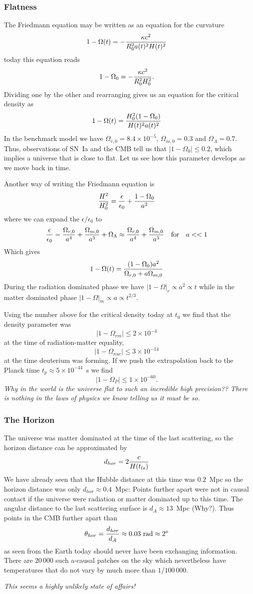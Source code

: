 \documentclass{article}
\begin{document}
\subsubsection*{Flatness}
The Friedmann equation may be written as an equation for the curvature
\[ 1-\Omega(t)=-{\kappa c^2\over R_0^2a(t)^2H(t)^2} \]
today this equation reads
\[ 1-\Omega_0=-{\kappa c^2\over R_0^2H_0^2}. \]
Dividing one by the other and rearranging gives us an equation for the critical density as
\[ 1-\Omega(t)={H_0^2(1-\Omega_0)\over H(t)^2a(t)^2} \]
In the benchmark model we have $\Omega_{r,0}=8.4\times 10^{-5}$, $\Omega_{m,0}=0.3$ and
$\Omega_\Lambda=0.7$. Thus, observations of SN~Ia and the CMB tell us that $|1-\Omega_0|\leq 0.2$, which implies a universe that is close 
to flat. Let us see how this parameter develops as we move back in time.
\par
Another way of writing the Friedmann equation is
\[ {H^2\over H_0^2}={\epsilon\over\epsilon_0}+{1-\Omega_0\over a^2} \]
where we can expand the $\epsilon/\epsilon_0$ to 
\[ {\epsilon\over\epsilon_0}={\Omega_{r,0}\over a^4}+{\Omega_{m,0}\over a^3}+{\Omega_{\Lambda}}\approx {\Omega_{r,0}\over a^4}+{\Omega_{m,0}\over a^3} \quad {\rm for} \quad a<<1 \]
Which gives
\[ 1-\Omega(t)={(1-\Omega_0)a^2\over\Omega_{r,0}+a\Omega_{m,0}} \]
During the radiation dominated phase we have $|1-\Omega|_r\propto a^2\propto t$ while in the matter dominated phase 
$|1-\Omega|_m\propto a\propto t^{2/3}$. 
\par
Using the number above for the critical density today at $t_0$ we find that the density parameter was 
\[ |1-\Omega_{rm}|\leq 2\times 10^{-4} \]
at the time of radiation-matter equality, 
\[ |1-\Omega_{nuc}|\leq 3\times 10^{-14} \]
at the time deuterium was forming. If we push the extrapolation back to the Planck time $t_p\approx 5\times 10^{-44}$~s we find 
\[ |1-\Omega_{P}|\leq 1\times 10^{-60}. \]
{\it Why in the world is the universe flat to such an incredible high precision?? There is nothing in the laws of physics we know telling 
us it must be so.}
\subsubsection*{The Horizon}
The universe was matter dominated at the time of the last scattering, so the horizon distance can be approximated by 
\[ d_{hor}=2{c\over H(t_{ls})} \]
We have already seen that the Hubble distance at this time was $0.2$~Mpc so the horizon distance was only $d_{hor}\approx 0.4$~Mpc: Points
further apart were not in causal contact if the universe were radiation or matter dominated up to this time. The angular distance to the last
scattering surface is $d_A\approx 13$~Mpc (Why?). Thus points in the CMB further apart than 
\[ \theta_{hor}={d_{hor}\over d_A}\approx 0.03~{\rm rad}\approx 2^o \]
as seen from the Earth today should never have been exchanging information. There are $20\,000$ such a-causal patches on the sky which 
nevertheless have temperatures that do not vary by much more than $1/100\,000$. 
\par
{\it This seems a highly unlikely state of affairs!}
\end{document}
